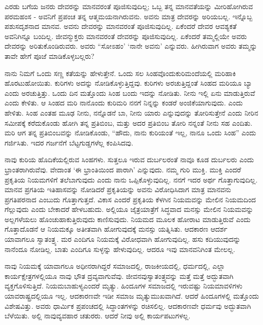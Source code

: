 ಎರಡು ಬಗೆಯ ಜನರು ದೇವರನ್ನು ಮಾನವರಂತೆ ಪೂಜಿಸುವುದಿಲ್ಲ; ಒಬ್ಬ ತನ್ನ ಮಾನವತೆಯನ್ನು ಮೀರಿಹೋಗಿರುವ ಪರಮಹಂಸ - ಅವನಿಗೆ ಪ್ರಪಂಚ ತನ್ನ ಆತ್ಮಮಯನಾಗಿರುವನು. ಅವನು ಮಾತ್ರ ದೇವರನ್ನು ಅರಿಯಬಲ್ಲ. ಇನ್ನೊಬ್ಬ ಪಶುಸದೃಶನಾದ ಮಾನವ. ಅವನು ದೇವರನ್ನು ಮಾನವರಂತೆ ಪೂಜಿಸುವುದಿಲ್ಲ. ಏಕೆಂದರೆ ದೇವರ ಆವಶ್ಯಕತೆ ಅವನಿಗಿನ್ನೂ ಬಂದಿಲ್ಲ. ಜೀವನ್ಮುಕ್ತರು ಮಾನವರಂತೆ ದೇವರನ್ನು ಪೂಜಿಸುವುದಿಲ್ಲ. ಏಕೆಂದರೆ ತಮ್ಮಲ್ಲಿಯೇ ಅವರು ದೇವರನ್ನು ಅರಿತುಕೊಂಡಿರುವರು. ಅವರು “ಸೋಽಹಂ’ ‘ನಾನೇ ಅವನು’ ಎನ್ನುವರು. ಹೀಗಿರುವಾಗ ಅವರು ತಮ್ಮನ್ನು ತಾವೇ ಹೇಗೆ ಪೂಜೆ ಮಾಡಿಕೊಳ್ಳಬಲ್ಲರು?

ನಾನು ನಿಮಗೆ ಒಂದು ಸಣ್ಣ ಕತೆಯನ್ನು ಹೇಳುತ್ತೇನೆ. ಒಂದು ಸಲ ಸಿಂಹವೊಂದು\break ಕುರಿಮಂದೆಯಲ್ಲಿ ಮರಿಹಾಕಿ ಹೊರಟುಹೋಯಿತು. ಕುರಿಗಳು ಅದನ್ನು ನೋಡಿಕೊಳ್ಳುತ್ತಿದ್ದವು. ಕುರಿಗಳು ಅರಚುತ್ತಿದ್ದಂತೆ ಸಿಂಹದ ಮರಿಯೂ ಬ್ಯಾ ಎಂದು ಅರಚುತ್ತಿತ್ತು. ಒಂದು ದಿನ ಮತ್ತೊಂದು ಸಿಂಹ ಬಂದು ಇದನ್ನು ನೋಡಿತು. ನೀನು ಇಲ್ಲಿ ಏನು ಮಾಡುತ್ತಿರುವೆ ಎಂದು ಕೇಳಿತು. ಆ ಸಿಂಹದ ಮರಿ ನಾನೊಂದು ಕುರಿಮರಿ ನನಗೆ ನಿನ್ನನ್ನು ಕಂಡರೆ ಅಂಜಿಕೆಯಾಗುವುದು. ಎಂದು ಹೇಳಿತು. ಸಿಂಹ ಎಂತಹ ಮೂಢ ನೀನು, ನನ್ನೊಡನೆ ಬಾ, ನೀನು ಯಾರು ಎನ್ನುವುದನ್ನು ತೋರಿಸುತ್ತೇನೆ ಎಂದು ನೀರಿನ ಸಮೀಪಕ್ಕೆ ಕರೆದುಕೊಂಡು ಹೋಗಿ ತನ್ನ ಪ್ರತಿಬಿಂಬ, ಮತ್ತು ಅದರ ಪ್ರತಿಬಿಂಬ ತೋರಿ ನನ್ನಂತೆ ನೀನು ಸಹ ಎಂದಿತು. ಮರಿ ಆಗ ತನ್ನ ಪ್ರತಿಬಿಂಬವನ್ನು ನೋಡಿಕೊಂಡು, “ಹೌದು, ನಾನು ಕುರಿಯಂತೆ ಇಲ್ಲ, ನಾನೂ ಒಂದು ಸಿಂಹ” ಎಂದು ಗರ್ಜಿಸಿತು. ಇದರ ಗರ್ಜನೆಗೆ ಬೆಟ್ಟಗುಡ್ಡಗಳೆಲ್ಲ ಕಂಪಿಸಿದವು.

ನಾವು ಕುರಿಯ ಹೊದಿಕೆಯಲ್ಲಿರುವ ಸಿಂಹಗಳು. ಸುತ್ತಲೂ ಇರುವ ದುರ್ಬಲರಂತೆ ನಾವೂ ಕೂಡ ದುರ್ಬಲರು ಎಂದು ಭ್ರಾಂತರಾಗಿರುವೆವು. ವೇದಾಂತ ‘ಈ ಭ್ರಾಂತಿಯಿಂದ ಪಾರಾಗಿ’ ಎನ್ನುವುದು. ನಮ್ಮ ಗುರಿ ಮುಕ್ತಿ. ಮುಕ್ತಿ ಎಂದರೆ ಪ್ರಕೃತಿಯ ನಿಯಮಗಳಿಗೆ ತಲೆಬಾಗುವುದು ಎಂದು ನಾನು ಒಪ್ಪಿಕೊಳ್ಳುವುದಿಲ್ಲ. ನನಗೆ ಇದರ ಅರ್ಥ ಗೊತ್ತಾಗುವುದಿಲ್ಲ. ಮಾನವ ಪ್ರಗತಿಯ ಇತಿಹಾಸವನ್ನು ನೋಡಿದರೆ ಪ್ರಕೃತಿಯನ್ನು ಅವನು ವಿರೋಧಿಸಿದಾಗ ಮಾತ್ರ ಮಾನವನು ಪ್ರಗತಿಪರನಾದ ಎಂಬುದು ಗೊತ್ತಾಗುತ್ತದೆ. ವಿಕಾಸ ಎಂದರೆ ಪ್ರಕೃತಿಯ ಕೆಳಗಿನ ನಿಯಮವನ್ನು ಮೇಲಿನ ನಿಯಮದಿಂದ ಗೆಲ್ಲುವುದು ಎಂದು ಬೇಕಾದರೆ ಹೇಳಬಹುದು. ಅಲ್ಲಿಯೂ ಜೈತ್ರಯಾತ್ರೆಗೆ ಸಿದ್ಧವಾದ ಮನಸ್ಸು ಮೇಲಿನ ನಿಯಮವನ್ನು ಅಲ್ಲಗಳೆಯಲು ಹೊಂಚುಹಾಕುತ್ತಿರುವುದು ಕಾಣಿಸುವುದು. ನಿಯಮದ ಮೂಲಕ ಹೋರಾಟ ಮಾಡುತ್ತಿರುವೆ ಎಂದು ಗೊತ್ತಾದೊಡನೆ ಆ ನಿಯಮಕ್ಕೂ ಅತೀತವಾಗಿ ಹೋಗುವುದಕ್ಕೆ ಮನಸ್ಸು ಯತ್ನಿಸಿತು. ಆದಕಾರಣ ಆದರ್ಶ ಯಾವಾಗಲೂ ಸ್ವಾತಂತ್ರ್ಯ. ಮರ ಎಂದಿಗೂ ನಿಯಮಕ್ಕೆ ವಿರೋಧವಾಗಿ ಹೋಗುವುದಿಲ್ಲ. ಹಸು ಕದಿಯುವುದನ್ನು ನಾನೆಂದೂ ನೋಡಿಲ್ಲ. ಬಾತು ಎಂದಿಗೂ ಸುಳ್ಳನ್ನು ಹೇಳುವುದಿಲ್ಲ. ಆದರೂ ಇವು ಮಾನವನಿಗಿಂತ ಮೇಲಲ್ಲ.

ನಾವು ನಿಯಮಕ್ಕೆ ಯಾವಾಗಲೂ ಅಧೀನರಾಗಿದ್ದರೆ ಸಮಾಜದಲ್ಲಿ, ರಾಜಕೀಯದಲ್ಲಿ, ಧರ್ಮದಲ್ಲಿ, ಎಲ್ಲಾ ಕಾರ್ಯಕ್ಷೇತ್ರಗಳಲ್ಲಿಯೂ ನಾವು ಭೌತ ದ್ರವ್ಯವಾಗುವೆವು. ಜೀವನವು\break ಸ್ವಾತಂತ್ರ್ಯವನ್ನು ಮತ್ತೆ ಮತ್ತೆ ಅದ್ಭುತವಾಗಿ ವ್ಯಕ್ತಗೊಳಿಸುತ್ತಿದೆ. ನಿಯಮಬಾಹುಳ್ಯ\break ಎಂದರೆ ಮೃತ್ಯು. ಹಿಂದೂಗಳ ಸಮಾಜದಲ್ಲಿ ಇರುವಷ್ಟು ನಿಯಮಾವಳಿಗಳು ಯಾವ\break ರಾಷ್ಟ್ರದಲ್ಲಿಯೂ ಇಲ್ಲ. ಆದಕಾರಣವೇ ಇಡೀ ಸಮಾಜ ಮೃತ್ಯುಮುಖವಾಗಿದೆ. ಆದರೆ ಹಿಂದೂಗಳಲ್ಲಿ ಮತ್ತೊಂದು ವಿಶೇಷವಿತ್ತು. ಅವರು ಧಾರ್ಮಿಕ ಪ್ರಪಂಚದಲ್ಲಿ ಸಿದ್ಧಾಂತಗಳನ್ನು ರಚಿಸಲಿಲ್ಲ. ಆದಕಾರಣವೇ ಧರ್ಮವು ಅದ್ಭುತವಾಗಿ ಬೆಳೆಯಿತು. ಅಲ್ಲಿ ನಾವು\break ವ್ಯವಹಾರ ಚತುರರು. ಆದರೆ ನೀವು ಅಲ್ಲಿ ಕಾರ್ಯಪಟುಗಳಲ್ಲ.

